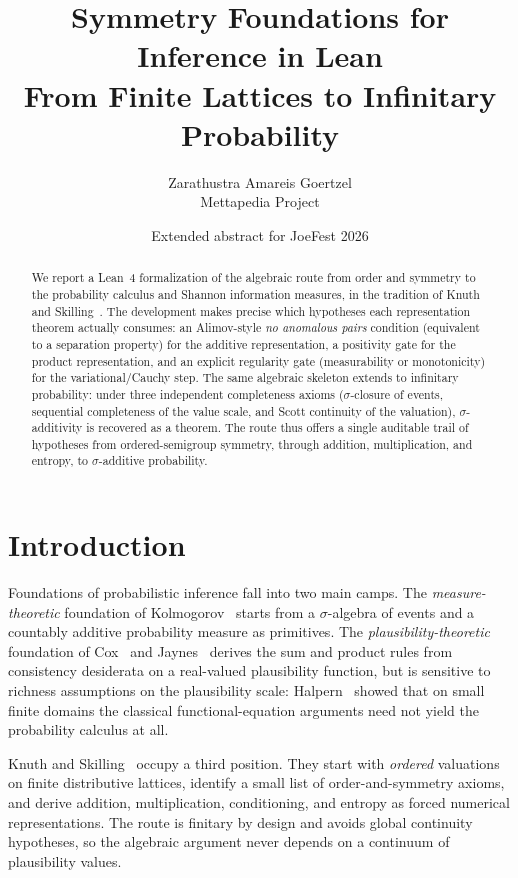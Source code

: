 \documentclass[11pt]{article}
\title{Symmetry Foundations for Inference in Lean\\From Finite Lattices to Infinitary Probability}
\author{Zarathustra Amareis Goertzel\\\small Mettapedia Project}
\date{Extended abstract for JoeFest 2026}
\theoremstyle{definition}
\theoremstyle{remark}
\begin{document}
\maketitle

\begin{abstract}
We report a Lean~4 formalization of the algebraic route from order and symmetry to the
probability calculus and Shannon information measures, in the tradition of Knuth and
Skilling~\cite{KnuthSkilling2012}. The development makes precise which hypotheses each
representation theorem actually consumes: an Alimov-style \emph{no anomalous pairs}
condition (equivalent to a separation property) for the additive representation, a
positivity gate for the product representation, and an explicit regularity gate
(measurability or monotonicity) for the variational/Cauchy step. The same algebraic
skeleton extends to infinitary probability: under three independent completeness axioms
($\sigma$-closure of events, sequential completeness of the value scale, and Scott
continuity of the valuation), $\sigma$-additivity is recovered as a theorem. The route
thus offers a single auditable trail of hypotheses from ordered-semigroup symmetry,
through addition, multiplication, and entropy, to $\sigma$-additive probability.
\end{abstract}

\section{Introduction}

Foundations of probabilistic inference fall into two main camps. The
\emph{measure-theoretic} foundation of Kolmogorov~\cite{Kolmogorov1933} starts from a
$\sigma$-algebra of events and a countably additive probability measure as primitives.
The \emph{plausibility-theoretic} foundation of Cox~\cite{Cox1946} and
Jaynes~\cite{Jaynes2003} derives the sum and product rules from consistency desiderata on
a real-valued plausibility function, but is sensitive to richness assumptions on the
plausibility scale: Halpern~\cite{Halpern1999} showed that on small finite domains the
classical functional-equation arguments need not yield the probability calculus at all.

Knuth and Skilling~\cite{KnuthSkilling2012} occupy a third position. They start with
\emph{ordered} valuations on finite distributive lattices, identify a small list of
order-and-symmetry axioms, and derive addition, multiplication, conditioning, and entropy
as forced numerical representations. The route is finitary by design and avoids global
continuity hypotheses, so the algebraic argument never depends on a continuum of
plausibility values.
\end{document}
